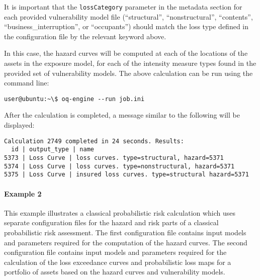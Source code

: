 It is important that the
\Verb+lossCategory+ parameter in the metadata section for each provided
vulnerability model file (``structural'', ``nonstructural'', ``contents'',
``business\_interruption'', or ``occupants'') should match the loss type
defined in the configuration file by the relevant keyword above.

In this case, the hazard curves will be computed at each of the locations of
the assets in the exposure model, for each of the intensity measure types
found in the provided set of vulnerability models. The above calculation can
be run using the command line:

\begin{Verbatim}[frame=single, commandchars=\\\{\}, samepage=true]
user@ubuntu:~\$ oq-engine --run job.ini
\end{Verbatim}

After the calculation is completed, a message similar to the following will be
displayed:

\begin{Verbatim}[frame=single, commandchars=\\\{\}, samepage=true]
Calculation 2749 completed in 24 seconds. Results:
  id | output_type | name
5373 | Loss Curve | loss curves. type=structural, hazard=5371
5374 | Loss Curve | loss curves. type=nonstructural, hazard=5371
5375 | Loss Curve | insured loss curves. type=structural hazard=5371
\end{Verbatim}


\paragraph{Example 2}

This example illustrates a classical probabilistic risk calculation which uses
separate configuration files for the hazard and risk parts of a classical
probabilistic risk assessment. The first configuration file contains input
models and parameters required for the computation of the hazard curves. The
second configuration file contains input models and parameters required for
the calculation of the loss exceedance curves and probabilistic loss maps for
a portfolio of assets based on the hazard curves and vulnerability models.

\inputminted[firstline=1,firstnumber=1,fontsize=\footnotesize,frame=single,linenos,bgcolor=lightgray,label=job\_hazard.ini]{ini}{oqum/risk/verbatim/config_classical_hazard.ini}\\

